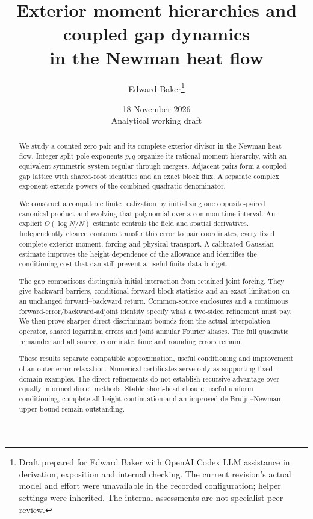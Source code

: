 \documentclass[11pt]{article}
\title{Exterior moment hierarchies and coupled gap dynamics\\in the Newman heat flow}
\author{Edward Baker\thanks{Draft prepared for Edward Baker with OpenAI Codex LLM assistance in derivation, exposition and internal checking. The current revision's actual model and effort were unavailable in the recorded configuration; helper settings were inherited. The internal assessments are not specialist peer review.}}
\date{18 November 2026\\\small Analytical working draft}
\numberwithin{equation}{section}
\theoremstyle{definition}
\theoremstyle{remark}
\begin{document}
\maketitle
\begin{abstract}
We study a counted zero pair and its complete exterior divisor in the
Newman heat flow. Integer split-pole exponents $p,q$ organize its
rational-moment hierarchy, with an equivalent symmetric system regular
through mergers. Adjacent pairs form a coupled gap lattice with shared-root
identities and an exact block flux. A separate complex exponent extends
powers of the combined quadratic denominator.

We construct a compatible finite realization by initializing one
opposite-paired canonical product and evolving that polynomial over a
common time interval. An explicit $O(\log N/N)$ estimate controls the
field and spatial derivatives. Independently cleared contours transfer
this error to pair coordinates, every fixed complete exterior moment,
forcing and physical transport. A calibrated Gaussian estimate improves
the height dependence of the allowance and identifies the conditioning
cost that can still prevent a useful finite-data budget.

The gap comparisons distinguish initial interaction from retained
joint forcing. They give backward barriers, conditional forward
block statistics and an exact limitation on an unchanged
forward--backward return. Common-source enclosures and a continuous
forward-error/backward-adjoint identity specify what a two-sided
refinement must pay. We then prove sharper direct discriminant bounds
from the actual interpolation operator, shared logarithm errors and
joint annular Fourier aliases. The full quadratic remainder and all
source, coordinate, time and rounding errors remain.

These results separate compatible approximation, useful conditioning and
improvement of an outer error relaxation. Numerical certificates serve
only as supporting fixed-domain examples. The direct refinements do not
establish recursive advantage over equally informed direct methods.
Stable short-head closure, useful uniform conditioning, complete
all-height continuation and an improved de Bruijn--Newman upper bound
remain outstanding.
\end{abstract}
\clearpage
\tableofcontents
\clearpage





















\appendix




\end{document}
